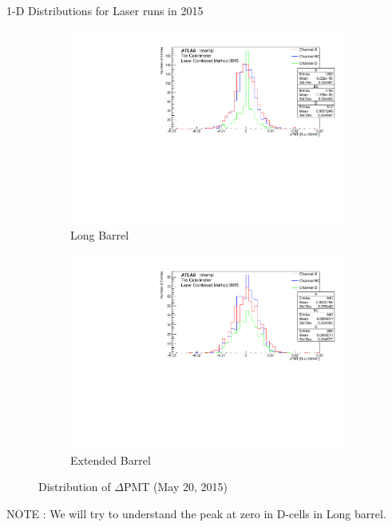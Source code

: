 \documentclass{beamer}
\begin{document}
\begin{frame}{1-D Distributions for Laser runs in 2015}
\begin{figure}[H]
\centering
\begin{subfigure} [t] {0.49\textwidth}
\includegraphics[width=\textwidth]{pmtLB1.pdf}
\caption{Long Barrel}
\end{subfigure}
\begin{subfigure} [t] {0.49\textwidth}
\includegraphics[width=\textwidth]{pmtEB1.pdf}
\caption{Extended Barrel}
\end{subfigure}
\caption{Distribution of $\Delta$PMT (May 20, 2015)}
\end{figure}
NOTE : We will try to understand the peak at zero in D-cells in Long barrel.
\end{frame}
\end{document}
